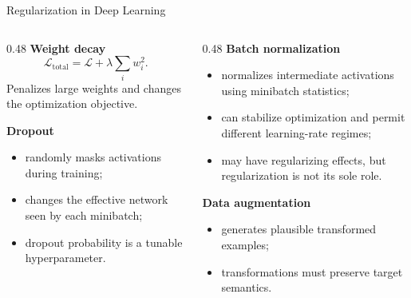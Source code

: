 
\begin{frame}{Regularization in Deep Learning}
\begin{columns}
\begin{column}{0.48\textwidth}
\textbf{Weight decay}
\[
  \mathcal{L}_{\text{total}}=\mathcal{L}+\lambda\sum_i w_i^2.
\]
Penalizes large weights and changes the optimization objective.

\vspace{0.5em}
\textbf{Dropout}
\begin{itemize}
  \item randomly masks activations during training;
  \item changes the effective network seen by each minibatch;
  \item dropout probability is a tunable hyperparameter.
\end{itemize}
\end{column}

\begin{column}{0.48\textwidth}
\textbf{Batch normalization}
\begin{itemize}
  \item normalizes intermediate activations using minibatch statistics;
  \item can stabilize optimization and permit different learning-rate regimes;
  \item may have regularizing effects, but regularization is not its sole role.
\end{itemize}

\vspace{0.5em}
\textbf{Data augmentation}
\begin{itemize}
  \item generates plausible transformed examples;
  \item transformations must preserve target semantics.
\end{itemize}
\end{column}
\end{columns}
\end{frame}

